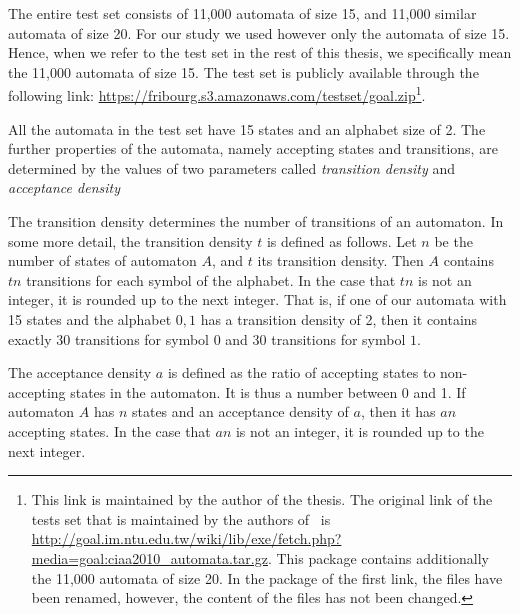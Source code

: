 The entire test set consists of 11,000 automata of size 15, and 11,000 similar automata of size 20. For our study we used however only the automata of size 15. Hence, when we refer to the \goal{} test set in the rest of this thesis, we specifically mean the 11,000 automata of size 15. The \goal{} test set is publicly available through the following link: \url{https://fribourg.s3.amazonaws.com/testset/goal.zip}\footnote{This link is maintained by the author of the thesis. The original link of the \goal{} tests set that is maintained by the authors of~\cite{2011_tsai} is \url{http://goal.im.ntu.edu.tw/wiki/lib/exe/fetch.php?media=goal:ciaa2010_automata.tar.gz}. This package contains additionally the 11,000 automata of size 20. In the package of the first link, the files have been renamed, however, the content of the files has not been changed.}.

All the automata in the test set have 15 states and an alphabet size of 2. The further properties of the automata, namely accepting states and transitions, are determined by the values of two parameters called \textit{transition density} and \textit{acceptance density}

The transition density determines the number of transitions of an automaton. In some more detail, the transition density $t$ is defined as follows. Let $n$ be the number of states of automaton $A$, and $t$ its transition density. Then $A$ contains $tn$ transitions for each symbol of the alphabet. In the case that $tn$ is not an integer, it is rounded up to the next integer. That is, if one of our automata with 15 states and the alphabet ${0, 1}$ has a transition density of 2, then it contains exactly 30 transitions for symbol $0$ and 30 transitions for symbol $1$. %

The acceptance density $a$ is defined as the ratio of accepting states to non-accepting states in the automaton. It is thus a number between 0 and 1. If automaton $A$ has $n$ states and an acceptance density of $a$, then it has $an$ accepting states. In the case that $an$ is not an integer, it is rounded up to the next integer. %

